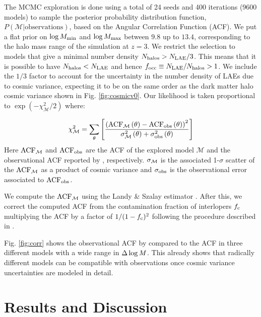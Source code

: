 \documentclass{emulateapj}
\newcommand{\mmax}{{\ifmmode{{M_{\rm max}}}\else{${M_{\rm max}}$}\fi}}
\newcommand{\dlm}{{\ifmmode{{\Delta \log M}}\else{$\Delta \log M$}\fi}}
\newcommand{\focc}{{\ifmmode{{f_{\rm occ}}}\else{${f_{\rm occ}}$}\fi}}
\begin{document}
The MCMC exploration is done using a total of 24 seeds and 400
iterations (9600 models) to sample the posterior  probability distribution function, $P(\mathcal{M}|\mathrm{observations})$, based on the Angular
Correlation Function (ACF). We put a flat prior on $\log M_{\rm min}$ and $\log \mmax$ between
$9.8$ up to $13.4$, corresponding to the halo mass range of
the simulation at $z=3$.
We restrict the selection to models that give a minimal number density
$N_{\rm{halos}}>N_{\rm LAE}/3$.
This means that it is possible to have $N_{\rm{halos}} < N_{\rm LAE}$
and hence $\focc\equiv N_{\rm{LAE}}/N_{\rm{halos}}>1$.
We include the $1/3$ factor to account for the uncertainty in the number
density of LAEs due to cosmic variance, expecting it to be on the
same order as the dark matter halo cosmic variance shown in
Fig. \ref{fig:cosmicv0}.   Our likelihood is taken proportional to
$ \exp(-\chi_{\mathcal  M}^2/2)$  where:

\begin{equation}
\chi_{\mathcal M}^2=
\sum_{\theta}\left[\frac{\left( \rm{ACF}_{\mathcal
      M}\left(\theta\right) - \rm{ACF}_{\rm
      obs}\left(\theta\right)\right)^2}{ \sigma_{\rm \mathcal
      M}^{2}\left(\theta\right) + \sigma_{\rm
      obs}^{2}\left(\theta\right)}\right]
\end{equation}
%
Here  $\rm{ACF}_{\mathcal M}$ and  $\rm{ACF}_{\rm obs}$ are the ACF
of the explored model ${\mathcal M}$ and the observational ACF
reported by \citet{Bielby16}, respectively.
$\sigma_{\rm \mathcal M}$ is the associated 1-$\sigma$ scatter  of the
$\rm{ACF}_{\mathcal M}$ as a product of cosmic variance and
$\sigma_{\rm obs}$ is the observational error associated to
$\rm{ACF}_{\rm obs}$.



We compute the $\rm{ACF}_{\mathcal M}$ using the Landy \&  Szalay
estimator  \citep{Landy1993}. After this,  we correct the computed ACF
from the contamination fraction of interlopers $f_{\rm c}$ multiplying the
ACF by a factor of $1/(1-f_{\rm c})^{2}$  following the  procedure described in
 \citet{Bielby16}.

Fig. \ref{fig:corr} shows the observational ACF by
\citet{Bielby16} compared to the ACF in three different models with a
wide range in $\dlm$.  
This already shows that radically different models can be compatible
with observations once cosmic variance uncertainties are modeled in
detail. 


\section{Results and Discussion}
\label{sec:results}
\end{document}
